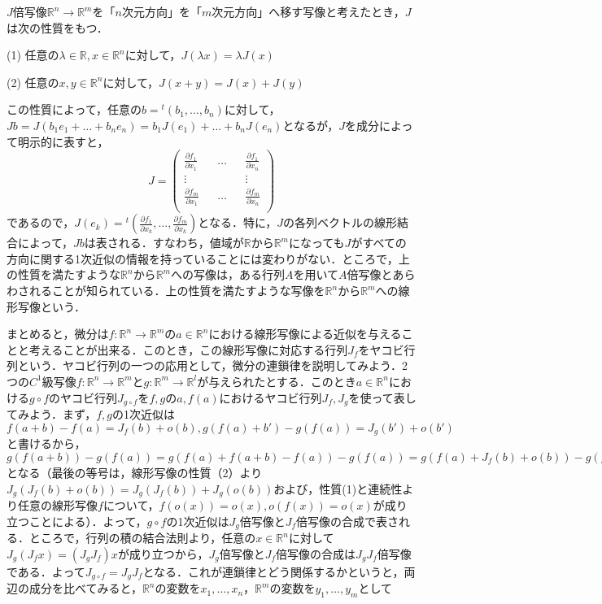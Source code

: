 \documentclass{jsarticle}
\def\vecb{\begin{pmatrix}}
\def\vece{\end{pmatrix}}
\def\realnum{{\mathbb R}}
\def\dfrac{\displaystyle\frac}
\def\tenchi{{}^t\!}
\def\delxkfo{\dfrac{\partial f_1}{\partial x_k}}
\def\delxkfm{\dfrac{\partial f_m}{\partial x_k}}
\def\delxofo{\dfrac{\partial f_1}{\partial x_1}}
\def\delxofm{\dfrac{\partial f_m}{\partial x_1}}
\def\delxnfo{\dfrac{\partial f_1}{\partial x_n}}
\def\delxnfm{\dfrac{\partial f_m}{\partial x_n}}
\begin{document}
$J$倍写像$\realnum^n\rightarrow\realnum^m$を「$n$次元方向」を「$m$次元方向」へ移す写像と考えたとき，$J$は次の性質をもつ．
\begin{description}
\item{(1)} 任意の$\lambda\in\realnum, x\in\realnum^n$に対して，$J(\lambda x)=\lambda J(x)$
\item{(2)} 任意の$x,y\in\realnum^n$に対して，$J(x+y)=J(x)+J(y)$
\end{description}
この性質によって，任意の$b=\tenchi(b_1,\dots,b_n)$に対して，$Jb=J(b_1e_1+\dots+ b_ne_n)=b_1J(e_1)+\dots+b_nJ(e_n)$となるが，$J$を成分によって明示的に表すと，
$$
J=\vecb \delxofo && \dots && \delxnfo \\ \vdots && && \vdots \\ \delxofm && \dots&&\delxnfm \\ \vece
$$
であるので，$J(e_k)=\tenchi\left(\delxkfo,\dots,\delxkfm\right)$となる．特に，$J$の各列ベクトルの線形結合によって，$Jb$は表される．すなわち，値域が$\realnum$から$\realnum^m$になっても$J$がすべての方向に関する1次近似の情報を持っていることには変わりがない．ところで，上の性質を満たすような$\realnum^n$から$\realnum^m$への写像は，ある行列$A$を用いて$A$倍写像とあらわされることが知られている．上の性質を満たすような写像を$\realnum^n$から$\realnum^m$への線形写像という．


まとめると，微分は$f:\realnum^n\rightarrow\realnum^m$の$a\in\realnum^n$における線形写像による近似を与えることと考えることが出来る．このとき，この線形写像に対応する行列$J_f$をヤコビ行列という．ヤコビ行列の一つの応用として，微分の連鎖律を説明してみよう．2つの$C^1$級写像$f:\realnum^n\rightarrow\realnum^m$と$g:\realnum^m\rightarrow\realnum^l$が与えられたとする．このとき$a\in\realnum^n$における$g\circ f$のヤコビ行列$J_{g\circ f}$を$f,g$の$a,f(a)$におけるヤコビ行列$J_f,J_g$を使って表してみよう．まず，$f,g$の1次近似は$f(a+b)-f(a)=J_f(b)+o(b),g(f(a)+b')-g(f(a))=J_g(b')+o(b')$と書けるから，$g(f(a+b))-g(f(a))=g(f(a)+f(a+b)-f(a))-g(f(a))=g(f(a)+J_f(b)+o(b))-g(f(a))=J_g(J_f(b)+o(b))+o(J_f(b)+o(b))=J_g(J_f(b))+o(b)$となる（最後の等号は，線形写像の性質（2）より$J_g(J_f(b)+o(b))=J_g(J_f(b))+J_g(o(b))$および，性質(1)と連続性より任意の線形写像$f$について，$f(o(x))=o(x),o(f(x))=o(x)$が成り立つことによる）．よって，$g\circ f$の1次近似は$J_g$倍写像と$J_f$倍写像の合成で表される．ところで，行列の積の結合法則より，任意の$x\in\realnum^n$に対して$J_g(J_fx)=(J_gJ_f)x$が成り立つから，$J_g$倍写像と$J_f$倍写像の合成は$J_gJ_f$倍写像である．よって$J_{g\circ f}=J_gJ_f$となる．これが連鎖律とどう関係するかというと，両辺の成分を比べてみると，$\realnum^n$の変数を$x_1,\dots,x_n$，$\realnum^m$の変数を$y_1,\dots,y_m$として
\end{document}
